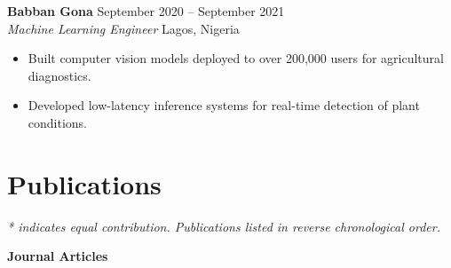 \documentclass[11pt, letterpaper]{article}
\newcommand{\cvheading}[2]{%
  \noindent\textbf{#1} \hfill \textcolor{mutedgray}{\small #2}%
}
\newcommand{\cvsub}[2]{%
  \noindent\textit{#1} \hfill \textcolor{mutedgray}{\small #2}%
}
\begin{document}
\vspace{6pt}

\cvheading{Babban Gona}{September 2020 -- September 2021}\\
\cvsub{Machine Learning Engineer}{Lagos, Nigeria}
\begin{itemize}
  \item Built computer vision models deployed to over 200,000 users for agricultural diagnostics.
  \item Developed low-latency inference systems for real-time detection of plant conditions.
\end{itemize}

\section{Publications}

\textit{* indicates equal contribution. Publications listed in reverse chronological order.}

\vspace{6pt}

\textbf{Journal Articles}
\end{document}
